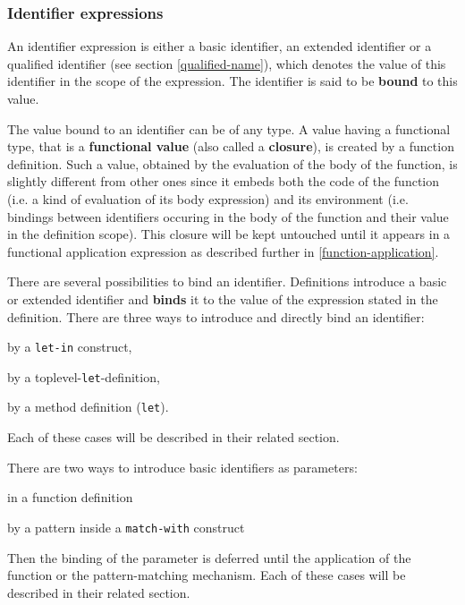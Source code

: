 \subsubsection{Identifier expressions}
\label{identifier-expressions}


An identifier expression is either a basic identifier, an extended
identifier or a qualified identifier (see section
\ref{qualified-name}), which denotes the value of this identifier in
the scope of the expression. The identifier is said to be {\bf bound}
to this value.

The value bound to an identifier can be of any type. A value having a
functional type, that is a {\bf functional
  value}\label{functional-value} (also called a
{\bf closure}), is created by a function definition. Such a value,
obtained by the evaluation of the body of the function, is slightly
different from other ones since it embeds both the code of the
function (i.e. a kind of evaluation of its body expression) and its
environment (i.e. bindings between identifiers occuring in the body of
the function and their value in the definition scope). This closure
will be kept untouched until it appears in a functional application
expression as described further in \ref{function-application}.

There are several possibilities to bind an identifier.  Definitions
introduce a basic or extended identifier and {\bf binds} it to the
value of the expression stated in the definition.  There are three
ways to introduce and directly bind an identifier:
\begin{compact-itemize}
  \item by a {\tt let-in} construct,
  \item by a toplevel-{\tt let}-definition,
  \item by a method definition ({\tt let}).
 \end{compact-itemize}
 Each of these cases will
be described in their related section.


There are two ways to introduce basic identifiers as parameters:
\begin{compact-itemize}
\item in a function definition
 \item by a pattern inside a {\tt match-with} construct
\end{compact-itemize}
Then the binding of the parameter is deferred until the application of
the function or the pattern-matching mechanism.
 Each of these cases will
be described in their related section.


